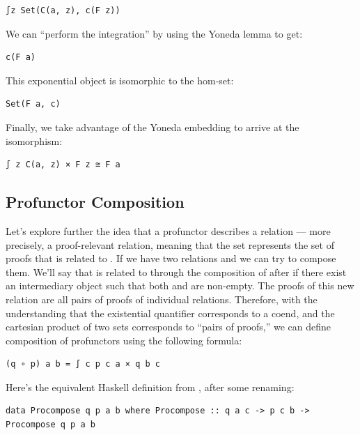 \begin{verbatim}
∫z Set(C(a, z), c(F z))
\end{verbatim}

We can ``perform the integration'' by using the Yoneda lemma to get:

\begin{verbatim}
c(F a)
\end{verbatim}

This exponential object is isomorphic to the hom-set:

\begin{verbatim}
Set(F a, c)
\end{verbatim}

Finally, we take advantage of the Yoneda embedding to arrive at the
isomorphism:

\begin{verbatim}
∫ z C(a, z) × F z ≅ F a
\end{verbatim}

\subsection{Profunctor Composition}\label{profunctor-composition}

Let's explore further the idea that a profunctor describes a relation
--- more precisely, a proof-relevant relation, meaning that the set
 represents the set of proofs that  is related
to . If we have two relations  and  we can
try to compose them. We'll say that  is related to 
through the composition of  after  if there exist an
intermediary object  such that both  and
 are non-empty. The proofs of this new relation are all
pairs of proofs of individual relations. Therefore, with the
understanding that the existential quantifier corresponds to a coend,
and the cartesian product of two sets corresponds to ``pairs of
proofs,'' we can define composition of profunctors using the following
formula:

\begin{verbatim}
(q ∘ p) a b = ∫ c p c a × q b c
\end{verbatim}

Here's the equivalent Haskell definition from
, after some renaming:

\begin{verbatim}
data Procompose q p a b where Procompose :: q a c -> p c b -> Procompose q p a b 
\end{verbatim}

